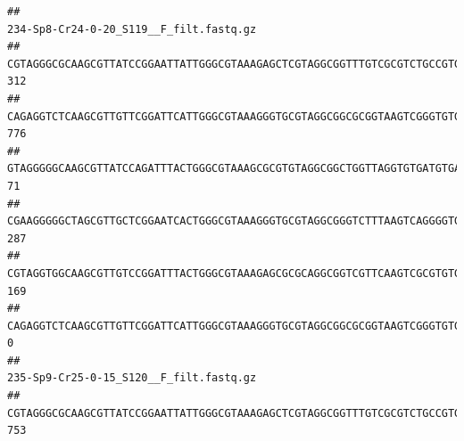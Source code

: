 \documentclass[]{article}
\begin{document}
\begin{verbatim}
##                                                                                                                                                                                                                                                           234-Sp8-Cr24-0-20_S119__F_filt.fastq.gz
## CGTAGGGCGCAAGCGTTATCCGGAATTATTGGGCGTAAAGAGCTCGTAGGCGGTTTGTCGCGTCTGCCGTGAAAGTCCGGGGCTCAACTCCGGATCTGCGGTGGGTACGGGCAGACTAGAGTGATGTAGGGGAGACTGGAATTCCTGGTGTAGCGGTGAAATGCGCAGATATCAGGAGGAACACCGATGGCGAAGGCAGGTCTCTGGGCATTAACTGACGCTGAGGAGCGAAAGCATGGGGAGCGAACA                                     312
## CAGAGGTCTCAAGCGTTGTTCGGATTCATTGGGCGTAAAGGGTGCGTAGGCGGCGCGGTAAGTCGGGTGTGAAATCTCGGAGCTTAACTCCGAAACTGCATTCGATACTGCCGTGCTTGAGGACTGGAGAGGAGACTGGAATTTACGGTGTAGCGGTGAAATGCGTAGATATCGTAAGGAAGACCAGTGGCGAAGGCGGGTCTCTGGACAGTTCCTGACGCTGAGGCACGAAGGCCAGGGGAGCAAACG                                     776
## GTAGGGGGCAAGCGTTATCCAGATTTACTGGGCGTAAAGCGCGTGTAGGCGGCTGGTTAGGTGTGATGTGAAATCTTCCGGCTCAACCGGAAAACTGCATTGCAAACCGGCCTGGCTAGAGTGCAGGAGAGGGAAGCGGAATTCCAGGTGTAGCGGTGAAATGCGTAGATATCTGGAGGAACACCAGTGGCGAAGGCGGCTTCCTGGCCTGCAACTGACGCTGAGACGCGAAAGCGTGGGGAGCGAAC                                       71
## CGAAGGGGGCTAGCGTTGCTCGGAATCACTGGGCGTAAAGGGTGCGTAGGCGGGTCTTTAAGTCAGGGGTGAAATCCTGGAGCTCAACTCCAGAACTGCCTTTGATACTGAAGATCTTGAGTTCGGGAGAGGTGAGTGGAACTGCGAGTGTAGAGGTGAAATTCGTAGATATTCGCAAGAACACCAGTGGCGAAGGCGGCTCACTGGCCCGATACTGACGCTGAGGCACGAAAGCGTGGGGAGCAAACA                                     287
## CGTAGGTGGCAAGCGTTGTCCGGATTTACTGGGCGTAAAGAGCGCGCAGGCGGTCGTTCAAGTCGCGTGTGAAAGCCCCCGGCTCAACTGGGGAGGGTCACGCGATACTGATCGACTCGAAGGCAGGAGAGGGTAGTGGAATTCCCGGTGTAGTGGTGAAATGCGTAGATATCGGGAGGAACACCAGTGGCGAAGGCGACTACCTGGCCTGTTCTTGACGCTGAGGCGCGAAAGCTAGGGGAGCAAACG                                     169
## CAGAGGTCTCAAGCGTTGTTCGGATTCATTGGGCGTAAAGGGTGCGTAGGCGGCGCGGTAAGTCGGGTGTGAAATCTCGGGGCTTAACTCCGAAACTGCATTCGATACTGCCGTGCTTGAGGACTGGAGAGGAGACTGGAATTTACGGTGTAGCGGTGAAATGCGTAGATATCGTAAGGAAGACCAGTGGCGAAGGCGGGTCTCTGGACAGTTCCTGACGCTGAGGCACGAAGGCCAGGGGAGCAAACG                                       0
##                                                                                                                                                                                                                                                           235-Sp9-Cr25-0-15_S120__F_filt.fastq.gz
## CGTAGGGCGCAAGCGTTATCCGGAATTATTGGGCGTAAAGAGCTCGTAGGCGGTTTGTCGCGTCTGCCGTGAAAGTCCGGGGCTCAACTCCGGATCTGCGGTGGGTACGGGCAGACTAGAGTGATGTAGGGGAGACTGGAATTCCTGGTGTAGCGGTGAAATGCGCAGATATCAGGAGGAACACCGATGGCGAAGGCAGGTCTCTGGGCATTAACTGACGCTGAGGAGCGAAAGCATGGGGAGCGAACA                                     753

\end{verbatim}
\end{document}
